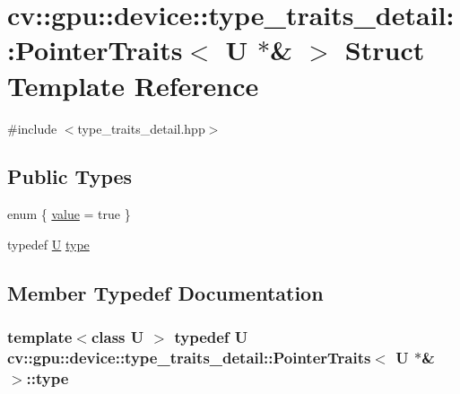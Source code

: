 \hypertarget{structcv_1_1gpu_1_1device_1_1type__traits__detail_1_1PointerTraits_3_01U_01_5_6_01_4}{\section{cv\-:\-:gpu\-:\-:device\-:\-:type\-\_\-traits\-\_\-detail\-:\-:Pointer\-Traits$<$ U $\ast$\& $>$ Struct Template Reference}
\label{structcv_1_1gpu_1_1device_1_1type__traits__detail_1_1PointerTraits_3_01U_01_5_6_01_4}
}


{\ttfamily \#include $<$type\-\_\-traits\-\_\-detail.\-hpp$>$}

\subsection*{Public Types}
\begin{DoxyCompactItemize}
\item 
enum \{ \hyperlink{structcv_1_1gpu_1_1device_1_1type__traits__detail_1_1PointerTraits_3_01U_01_5_6_01_4_aa9298c06e66420cb440f3bd7410607e1a85e3e403c83baee99f2adfd67831088b}{value} = true
 \}
\item 
typedef \hyperlink{core__c_8h_aa9c521f41af9a5191e5e4b6ffbae211a}{U} \hyperlink{structcv_1_1gpu_1_1device_1_1type__traits__detail_1_1PointerTraits_3_01U_01_5_6_01_4_a3e566e102079006d8cbcc66ea121861d}{type}
\end{DoxyCompactItemize}


\subsection{Member Typedef Documentation}
\hypertarget{structcv_1_1gpu_1_1device_1_1type__traits__detail_1_1PointerTraits_3_01U_01_5_6_01_4_a3e566e102079006d8cbcc66ea121861d}{
\subsubsection[{type}]{\setlength{\rightskip}{0pt plus 5cm}template$<$class U $>$ typedef {\bf U} {\bf cv\-::gpu\-::device\-::type\-\_\-traits\-\_\-detail\-::\-Pointer\-Traits}$<$ {\bf U} $\ast$\& $>$\-::{\bf type}}}\label{structcv_1_1gpu_1_1device_1_1type__traits__detail_1_1PointerTraits_3_01U_01_5_6_01_4_a3e566e102079006d8cbcc66ea121861d}


